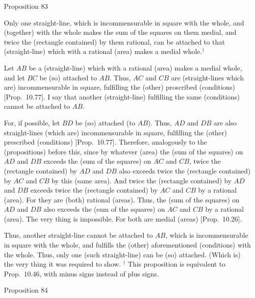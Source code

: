 
\begin{center}
{\large Proposition 83}
\end{center}

Only  one straight-line, which is incommensurable
in square with the whole, and (together) with the whole makes the sum of the squares on them
medial, and twice the (rectangle contained) by them rational, can be
attached to that (straight-line) which with a rational (area) makes a
medial whole.$^\dag$

\epsfysize=0.25in 
\centerline{}

Let $AB$ be a (straight-line) which with a rational (area) makes a medial
whole,  and let $BC$ be (so) attached to $AB$. Thus, $AC$ and $CB$
are (straight-lines which are) incommensurable in square, fulfilling the (other) proscribed (conditions) [Prop.~10.77]. I say that another (straight-line)
fulfilling the same (conditions) cannot be attached to $AB$.

For, if possible, let $BD$ be (so) attached (to $AB$). Thus, $AD$ and
$DB$ are also straight-lines (which are) incommensurable in square,
fulfilling the (other) prescribed  (conditions) [Prop.~10.77]. Therefore, analogously to the
(propositions) before this, since by whatever (area)
the (sum of the squares) on $AD$ and $DB$ exceeds the (sum of the
squares) on $AC$ and $CB$,  twice the (rectangle contained)
by $AD$ and $DB$ also exceeds twice the (rectangle contained) by
$AC$ and $CB$ by this (same area). And twice the (rectangle contained) by $AD$ and
$DB$ exceeds twice the (rectangle contained) by $AC$ and
$CB$ by a rational (area). For they are (both) rational (areas).
Thus, the (sum of the squares) on 
$AD$ and $DB$ also exceeds the (sum of the squares) on $AC$ and $CB$
by a rational (area). The very thing is impossible. For both are
medial (areas) [Prop.~10.26].

 Thus, another
straight-line cannot be attached to $AB$, which is incommensurable
in square with the whole, and fulfills the (other) aforementioned (conditions) with the
whole. Thus, only one (such straight-line) can be (so) attached. (Which is)
the very thing it was required to show.
{\footnotesize\noindent$^\dag$
This proposition is equivalent to Prop.~10.46, with minus signs instead of
plus signs.}


\begin{center}
{\large Proposition 84}
\end{center}

